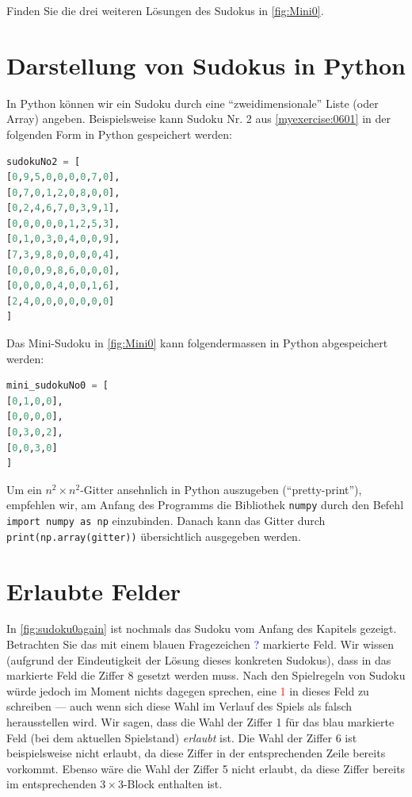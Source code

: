 \begin{myexercise}\label{myexercise:0677}
	Finden Sie die drei weiteren Lösungen des Sudokus in \cref{fig:Mini0}.
\end{myexercise}

\section{Darstellung von Sudokus in Python}
In Python können wir ein Sudoku durch eine \enquote{zweidimensionale} Liste (oder Array) angeben. Beispielsweise kann Sudoku Nr. 2 aus \cref{myexercise:0601} in der folgenden Form in Python gespeichert werden:
\begin{lstlisting}[language=Python,caption=Abspeichern von Sudoku-Gittern in Python,numbers=none]
sudokuNo2 = [
[0,9,5,0,0,0,0,7,0],
[0,7,0,1,2,0,8,0,0],
[0,2,4,6,7,0,3,9,1],
[0,0,0,0,0,1,2,5,3],
[0,1,0,3,0,4,0,0,9],
[7,3,9,8,0,0,0,0,4],
[0,0,0,9,8,6,0,0,0],
[0,0,0,0,4,0,0,1,6],
[2,4,0,0,0,0,0,0,0]
]
\end{lstlisting}
Das Mini-Sudoku in \cref{fig:Mini0} kann folgendermassen in Python abgespeichert werden:
\begin{lstlisting}[language=Python,caption=Abspeichern von Mini-Sudoku-Gittern in Python,numbers=none]
mini_sudokuNo0 = [
[0,1,0,0],
[0,0,0,0],
[0,3,0,2],
[0,0,3,0]
]
\end{lstlisting}
Um ein $n^2\times n^2$-Gitter ansehnlich in Python auszugeben (\enquote{pretty-print}), empfehlen wir, am Anfang des Programms die Bibliothek \lstinline|numpy| durch den Befehl \lstinline|import numpy as np| einzubinden. Danach kann das Gitter durch \lstinline|print(np.array(gitter))| übersichtlich ausgegeben werden.

\section{Erlaubte Felder}
In \cref{fig:sudoku0again} ist nochmals das Sudoku vom Anfang des Kapitels gezeigt. Betrachten Sie das mit einem blauen Fragezeichen \textcolor{Blue}{?} markierte Feld. Wir wissen (aufgrund der Eindeutigkeit der Lösung dieses konkreten Sudokus), dass in das markierte Feld die Ziffer 8 gesetzt werden muss. Nach den Spielregeln von Sudoku würde jedoch im Moment nichts dagegen sprechen, eine \textcolor{Red}{1} in dieses Feld zu schreiben --- auch wenn sich diese Wahl im Verlauf des Spiels als falsch herausstellen wird. Wir sagen, dass die Wahl der Ziffer 1 für das blau markierte Feld (bei dem aktuellen Spielstand) \textit{erlaubt} ist. Die Wahl der Ziffer 6 ist beispielsweise nicht erlaubt, da diese Ziffer in der entsprechenden Zeile bereits vorkommt. Ebenso wäre die Wahl der Ziffer 5 nicht erlaubt, da diese Ziffer bereits im entsprechenden $3\times 3$-Block enthalten ist.

